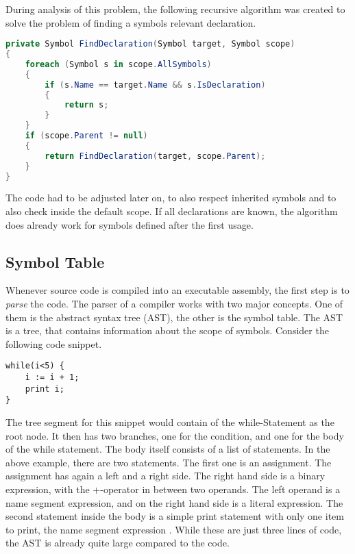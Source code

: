 During analysis of this problem, the following recursive algorithm was created to solve the problem of finding a symbols relevant declaration.

\begin{lstlisting}[language=csharp, caption={Finding Symbol Definition}, captionpos=b, label={lst:findsymbol}]
private Symbol FindDeclaration(Symbol target, Symbol scope)
{
    foreach (Symbol s in scope.AllSymbols)
    {
        if (s.Name == target.Name && s.IsDeclaration)
        {
            return s;
        }
    }
    if (scope.Parent != null)
    {
        return FindDeclaration(target, scope.Parent);
    }
}
\end{lstlisting}
The code had to be adjusted later on, to also respect inherited symbols and to also check inside the default scope.
If all declarations are known, the algorithm does already work for symbols defined after the first usage.

\subsection{Symbol Table}
Whenever source code is compiled into an executable assembly, the first step is to \textit{parse} the code.
The parser of a compiler works with two major concepts.
One of them is the abstract syntax tree (AST), the other is the symbol table.
The AST is a tree, that contains information about the scope of symbols.
Consider the following code snippet.

\begin{lstlisting}[language=dafny, caption={AST Demo Snippet}, captionpos=b, label={lst:astsnipped}]
while(i<5) {
    i := i + 1;
    print i;
}
\end{lstlisting}

The tree segment for this snippet would contain of the while-Statement as the root node.
It then has two branches, one for the condition, and one for the body of the while statement.
The body itself consists of a list of statements.
In the above example, there are two statements.
The first one is an assignment.
The assignment has again a left and a right side.
The right hand side is a binary expression, with the +-operator in between two operands.
The left operand is a name segment expression, and on the right hand side is a literal expression.
The second statement inside the body is a simple print statement with only one item to print, the name segment expression .
While these are just three lines of code, the AST is already quite large compared to the code.\\

